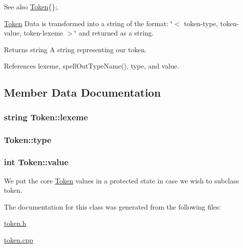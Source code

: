 \begin{DoxySeeAlso}{See also}
\hyperlink{classToken}{Token}\{\};.
\end{DoxySeeAlso}
\hyperlink{classToken}{Token} Data is transformed into a string of the format: \char`\"{}$<$ token-\/type, token-\/value, token-\/lexeme $>$\char`\"{} and returned as a string. \begin{DoxyReturn}{Returns}
string A string representing our token. 
\end{DoxyReturn}


References lexeme, spellOutTypeName(), type, and value.



\subsection{Member Data Documentation}
\hypertarget{classToken_af4c57a4ede01f2040ea4927141f5a661}{
\subsubsection[{lexeme}]{\setlength{\rightskip}{0pt plus 5cm}string {\bf Token::lexeme}}}
\label{classToken_af4c57a4ede01f2040ea4927141f5a661}
\hypertarget{classToken_a7e5e6513d379ca2e388273b23ea1ba4a}{
\subsubsection[{type}]{ {\bf Token::type}}}
\label{classToken_a7e5e6513d379ca2e388273b23ea1ba4a}
\hypertarget{classToken_a041346a45c6c5571a78a6af3394a2756}{
\subsubsection[{value}]{\setlength{\rightskip}{0pt plus 5cm}int {\bf Token::value}}}
\label{classToken_a041346a45c6c5571a78a6af3394a2756}


We put the core \hyperlink{classToken}{Token} values in a protected state in case we wish to subclass token. 



The documentation for this class was generated from the following files:\begin{DoxyCompactItemize}
\item 
\hyperlink{token_8h}{token.h}\item 
\hyperlink{token_8cpp}{token.cpp}\end{DoxyCompactItemize}
